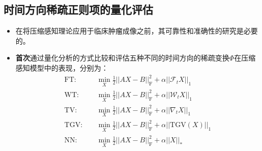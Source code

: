 \documentclass{beamer}
\begin{document}
\subsection{时间方向稀疏正则项的量化评估}
\begin{frame}
	\begin{itemize}
		\item 在将压缩感知理论应用于临床肿瘤成像之前，其可靠性和准确性的研究是必要的。
		\item \textbf{首次}通过量化分析的方式比较和评估五种不同的时间方向的稀疏变换$\Phi$在压缩感知模型中的表现，分别为：
		\begin{equation}
		\begin{aligned}
	 \mathrm{FT}:\quad &\min_X\frac{1}{2}||AX-B||_{\mathrm{F}}^2 + \alpha||\mathcal{F}_tX||_1 \\
	 \mathrm{WT}:\quad &\min_X\frac{1}{2}||AX-B||_{\mathrm{F}}^2 + \alpha||\mathcal{W}_tX||_1 \\
	 \mathrm{TV}:\quad &\min_X\frac{1}{2}||AX-B||_{\mathrm{F}}^2 + \alpha||\nabla_t X||_1 \\
	 \mathrm{TGV}:\quad &\min_X\frac{1}{2}||AX-B||_{\mathrm{F}}^2 + \alpha||\mathrm{TGV}(X)||_1 \\
	 \mathrm{NN}:\quad &\min_X\frac{1}{2}||AX-B||_{\mathrm{F}}^2 + \alpha||X||_*
\end{aligned}
\end{equation}
	\end{itemize}
\end{frame}


\end{document}
